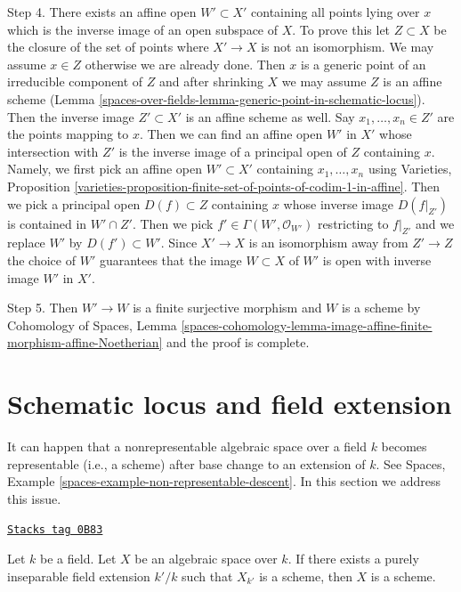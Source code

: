 \begin{remark}
\medskip\noindent
Step 4. There exists an affine open $W' \subset X'$ containing all points
lying over $x$ which is the inverse image of an open subspace of $X$.
To prove this let $Z \subset X$ be the closure of the set of points
where $X' \to X$ is not an isomorphism. We may assume $x \in Z$ otherwise
we are already done. Then $x$ is a generic point of an irreducible
component of $Z$ and after shrinking $X$ we may assume $Z$ is an affine scheme
(Lemma \ref{spaces-over-fields-lemma-generic-point-in-schematic-locus}).
Then the inverse image $Z' \subset X'$ is an affine scheme as well.
Say $x_1, \ldots, x_n \in Z'$ are the points mapping to $x$.
Then we can find an affine open $W'$ in $X'$ whose intersection with
$Z'$ is the inverse image of a principal open of $Z$ containing $x$.
Namely, we first pick an affine open $W' \subset X'$ containing
$x_1, \ldots, x_n$ using Varieties, Proposition
\ref{varieties-proposition-finite-set-of-points-of-codim-1-in-affine}.
Then we pick a principal open $D(f) \subset Z$ containing $x$
whose inverse image $D(f|_{Z'})$ is contained in $W' \cap Z'$.
Then we pick $f' \in \Gamma(W', \mathcal{O}_{W'})$ restricting
to $f|_{Z'}$ and we replace $W'$ by $D(f') \subset W'$.
Since $X' \to X$ is an isomorphism away from $Z' \to Z$ the choice
of $W'$ guarantees that the image $W \subset X$ of $W'$ is open
with inverse image $W'$ in $X'$.

\medskip\noindent
Step 5. Then $W' \to W$ is a finite surjective morphism and $W$ is a scheme by
Cohomology of Spaces, Lemma
\ref{spaces-cohomology-lemma-image-affine-finite-morphism-affine-Noetherian}
and the proof is complete.
\end{remark}

\section{Schematic locus and field extension}
\label{spaces-over-fields-section-schematic-and-field-extension}
It can happen that a nonrepresentable algebraic space over a field $k$
becomes representable (i.e., a scheme) after base change to an extension
of $k$. See Spaces, Example \ref{spaces-example-non-representable-descent}.
In this section we address this issue.

\begin{lemma}
\label{spaces-over-fields-lemma-scheme-after-purely-inseparable-base-change}
\href{https://stacks.math.columbia.edu/tag/0B83}{\texttt{Stacks tag 0B83}}

Let $k$ be a field. Let $X$ be an algebraic space over $k$.
If there exists a purely inseparable field extension $k'/k$
such that $X_{k'}$ is a scheme, then $X$ is a scheme.
\end{lemma}

